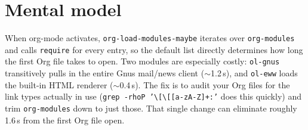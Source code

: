 \section{Mental model}
When org-mode activates, \texttt{org-load-modules-maybe} iterates over
\texttt{org-modules} and calls \texttt{require} for every entry, so the
default list directly determines how long the first Org file takes to
open.  Two modules are especially costly: \texttt{ol-gnus} transitively
pulls in the entire Gnus mail/news client (\(\sim\)1.2\,s), and
\texttt{ol-eww} loads the built-in HTML renderer (\(\sim\)0.4\,s).  The
fix is to audit your Org files for the link types actually in use
(\texttt{grep -rhoP '\textbackslash[\textbackslash[[a-zA-Z]+:'} does
this quickly) and trim \texttt{org-modules} down to just those.  That
single change can eliminate roughly 1.6\,s from the first Org file open.
